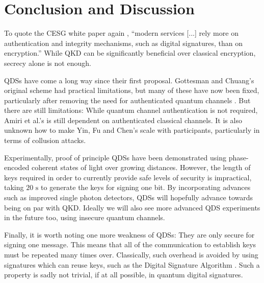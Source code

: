 \documentclass[%
 reprint,
 amsmath,amssymb,
 aps,
 pra,
]{revtex4-1}
\begin{document}
\section{Conclusion and Discussion}
\label{sec:conclusion}

To quote the CESG white paper again \cite{CESG16}, ``modern services [...] rely more on authentication and integrity mechanisms, such as digital signatures, than on encryption.'' While QKD can be significantly beneficial over classical encryption, secrecy alone is not enough.

QDSs have come a long way since their first proposal. Gottesman and Chuang's original scheme \cite{quant-ph/0105032} had practical limitations, but many of these have now been fixed, particularly after removing the need for authenticated quantum channels \cite{PhysRevA.93.032316, PhysRevA.93.032325}. But there are still limitations: While quantum channel authentication is not required, Amiri et al.'s is still dependent on authenticated classical channels. It is also unknown how to make Yin, Fu and Chen's scale with participants, particularly in terms of collusion attacks.

Experimentally, proof of principle QDSs have been demonstrated using phase-encoded coherent states of light over growing distances. However, the length of keys required in order to currently provide safe levels of security is impractical, taking $20\text{ s}$ to generate the keys for signing one bit. By incorporating advances such as improved single photon detectors, QDSs will hopefully advance towards being on par with QKD. Ideally we will also see more advanced QDS experiments in the future too, using insecure quantum channels.

Finally, it is worth noting one more weakness of QDSs: They are only secure for signing one message. This means that all of the communication to establish keys must be repeated many times over. Classically, such overhead is avoided by using signatures which can reuse keys, such as the Digital Signature Algorithm \cite{kravitz1993digital}. Such a property is sadly not trivial, if at all possible, in quantum digital signatures.


\appendix
\end{document}
